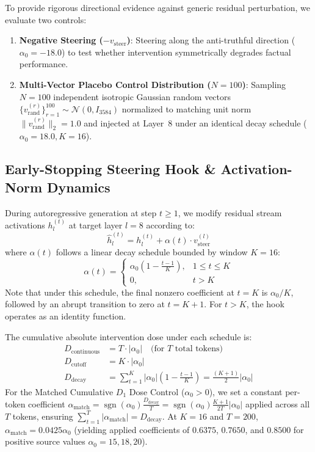 \documentclass[conference]{IEEEtran}
\begin{document}
To provide rigorous directional evidence against generic residual perturbation, we evaluate two controls:
\begin{enumerate}
    \item \textbf{Negative Steering ($-v_{\text{steer}}$)}: Steering along the anti-truthful direction ($\alpha_0=-18.0$) to test whether intervention symmetrically degrades factual performance.
    \item \textbf{Multi-Vector Placebo Control Distribution ($N=100$)}: Sampling $N=100$ independent isotropic Gaussian random vectors $\{v_{\text{rand}}^{(r)}\}_{r=1}^{100} \sim \mathcal{N}(0, I_{3584})$ normalized to matching unit norm $\|v_{\text{rand}}^{(r)}\|_2 = 1.0$ and injected at Layer~8 under an identical decay schedule ($\alpha_0=18.0, K=16$).
\end{enumerate}

\subsection{Early-Stopping Steering Hook \& Activation-Norm Dynamics}
During autoregressive generation at step $t \ge 1$, we modify residual stream activations $h_l^{(t)}$ at target layer $l=8$ according to:
\begin{equation}
\hat{h}_l^{(t)} = h_l^{(t)} + \alpha(t) \cdot v_{\text{steer}}^{(l)}
\end{equation}
where $\alpha(t)$ follows a linear decay schedule bounded by window $K=16$:
\begin{equation}
\alpha(t) = \begin{cases}
\alpha_0 \left(1 - \frac{t-1}{K}\right), & 1 \le t \le K \\
0, & t > K
\end{cases}
\end{equation}
Note that under this schedule, the final nonzero coefficient at $t=K$ is $\alpha_0/K$, followed by an abrupt transition to zero at $t=K+1$. For $t > K$, the hook operates as an identity function.

The cumulative absolute intervention dose under each schedule is:
\begin{align}
D_{\text{continuous}} &= T \cdot |\alpha_0| \quad \text{(for $T$ total tokens)} \\
D_{\text{cutoff}} &= K \cdot |\alpha_0| \\
D_{\text{decay}} &= \sum_{t=1}^{K} |\alpha_0|\left(1 - \frac{t-1}{K}\right) = \frac{(K+1)}{2}|\alpha_0|
\end{align}
For the Matched Cumulative $D_1$ Dose Control ($\alpha_0 > 0$), we set a constant per-token coefficient $\alpha_{\text{match}} = \operatorname{sgn}(\alpha_0)\frac{D_{\text{decay}}}{T} = \operatorname{sgn}(\alpha_0)\frac{K+1}{2T}|\alpha_0|$ applied across all $T$ tokens, ensuring $\sum_{t=1}^T |\alpha_{\text{match}}| = D_{\text{decay}}$. At $K=16$ and $T=200$, $\alpha_{\text{match}} = 0.0425 \alpha_0$ (yielding applied coefficients of $0.6375$, $0.7650$, and $0.8500$ for positive source values $\alpha_0 = 15, 18, 20$).
\end{document}
